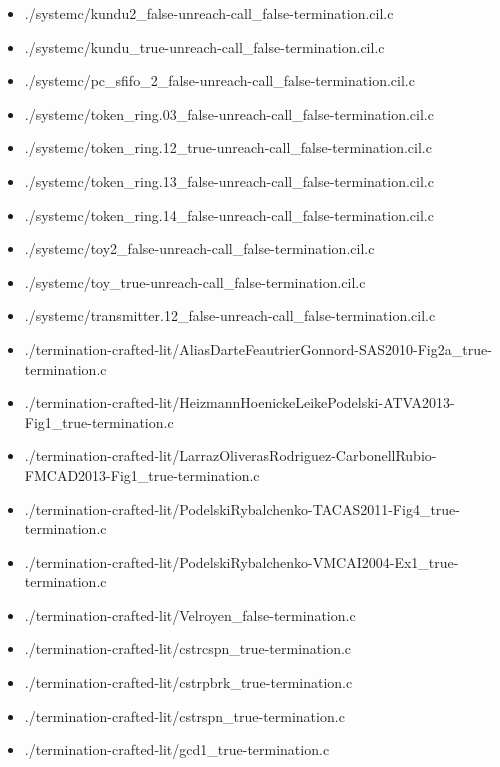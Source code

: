 \documentclass[envcountsame]{llncs}
\begin{document}
\begin{itemize}
\item ./systemc/kundu2\_false-unreach-call\_false-termination.cil.c
\item ./systemc/kundu\_true-unreach-call\_false-termination.cil.c
\item ./systemc/pc\_sfifo\_2\_false-unreach-call\_false-termination.cil.c
\item ./systemc/token\_ring.03\_false-unreach-call\_false-termination.cil.c
\item ./systemc/token\_ring.12\_true-unreach-call\_false-termination.cil.c
\item ./systemc/token\_ring.13\_false-unreach-call\_false-termination.cil.c
\item ./systemc/token\_ring.14\_false-unreach-call\_false-termination.cil.c
\item ./systemc/toy2\_false-unreach-call\_false-termination.cil.c
\item ./systemc/toy\_true-unreach-call\_false-termination.cil.c
\item ./systemc/transmitter.12\_false-unreach-call\_false-termination.cil.c


\item ./termination-crafted-lit/AliasDarteFeautrierGonnord-SAS2010-Fig2a\_true-termination.c
\item ./termination-crafted-lit/HeizmannHoenickeLeikePodelski-ATVA2013-Fig1\_true-termination.c
\item ./termination-crafted-lit/LarrazOliverasRodriguez-CarbonellRubio-FMCAD2013-Fig1\_true-termination.c
\item ./termination-crafted-lit/PodelskiRybalchenko-TACAS2011-Fig4\_true-termination.c
\item ./termination-crafted-lit/PodelskiRybalchenko-VMCAI2004-Ex1\_true-termination.c
\item ./termination-crafted-lit/Velroyen\_false-termination.c
\item ./termination-crafted-lit/cstrcspn\_true-termination.c
\item ./termination-crafted-lit/cstrpbrk\_true-termination.c
\item ./termination-crafted-lit/cstrspn\_true-termination.c
\item ./termination-crafted-lit/gcd1\_true-termination.c



\end{itemize}
\end{document}
